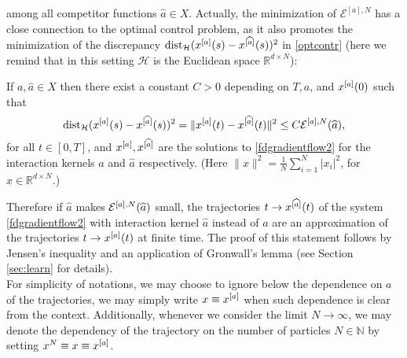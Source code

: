 among all competitor functions $\widehat a \in X$. 
Actually, the minimization of $\mathcal E^{[a],N}$ has a close connection to the optimal control problem, as it also promotes the minimization of the discrepancy $ \operatorname{dist}_{\mathcal H}(x^{[a]}(s) - x^{[\widehat a]}(s))^2$ in  \eqref{optcontr} (here we remind that in this setting $\mathcal H$ is the Euclidean space $\mathbb R^{d \times N}$):
\begin{proposition}\label{trajapprox}
If $a,\widehat a \in X$ then there exist a constant $C>0$ depending on $T, a$, and $x^{[a]}(0)$ such that
\begin{equation}\label{eq:trajapprox}
 \operatorname{dist}_{\mathcal H}(x^{[a]}(s) - x^{[\widehat a]}(s))^2= \| x^{[a]} (t) -x^{[\widehat a]}  (t) \|^2 \leq C {\mathcal E^{[a],N}(\widehat a)}, 
\end{equation}
for all $t \in [0,T]$, and $x^{[a]} , x^{[\widehat a]}  $ are the solutions to \eqref{fdgradientflow2} for the interaction kernels $a$ and $\widehat a$ respectively. (Here $\| x \|^2 = \frac{1}{N} \sum_{i=1}^N |x_i|^2$, for $x \in \mathbb R^{d \times N}$.)
\end{proposition}
Therefore if $\widehat a$ makes $\mathcal E^{[a],N}(\widehat a)$ small, the trajectories $t\to x^{[\widehat a]}(t)$ of the system \eqref{fdgradientflow2} with interaction kernel $\widehat a$ instead of $a$ are an approximation of the trajectories $t \to x^{[a]}(t)$ at finite time. 
The proof of this statement follows by Jensen's inequality and an application of Gronwall's lemma (see Section \ref{sec:learn} for details). \\

 For simplicity of notations, we may choose to ignore below the dependence on $a$ of the trajectories, we may simply write $x \equiv x^{[a]}$ when such dependence is clear from the context. Additionally, whenever we consider the limit $N \to \infty$,  we may denote the dependency of the trajectory on the number of particles $N \in \mathbb N$ by setting $x^N\equiv x \equiv x^{[a]}$.
\\

